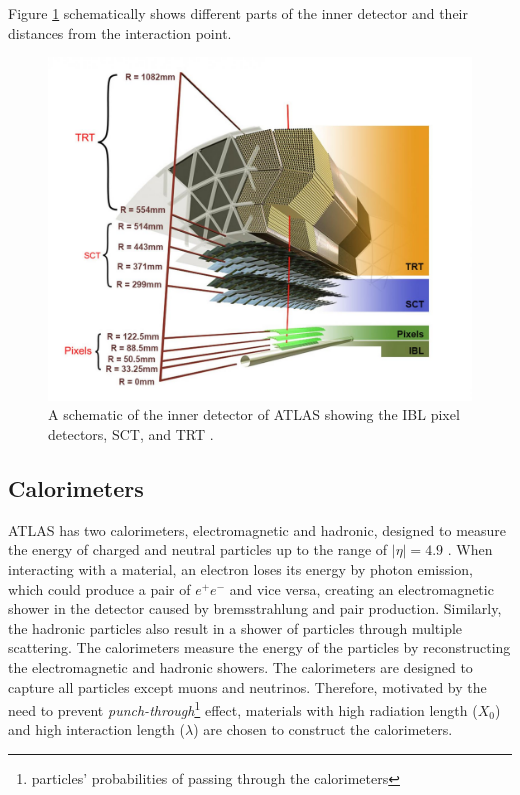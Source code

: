 Figure \ref{fig:ATLAS_ID} schematically shows different parts of the inner detector and their distances from the interaction point.

\begin{figure}
    \centering
    \includegraphics[width=.98\linewidth]{figures/LHC/ATLAS_InnerDetector.jpg}
    \caption{ A schematic of the inner detector of ATLAS showing the IBL pixel detectors, SCT, and TRT \cite{ID_Align_Run2}.\label{fig:ATLAS_ID}}
\end{figure}

\subsection{Calorimeters}
\label{subsec:Cal}

ATLAS has two calorimeters, electromagnetic and hadronic, designed to measure the energy of charged and neutral particles up to the range of $|\eta|=4.9$ \cite{ATLAS}. When interacting with a material, an electron loses its energy by photon emission, which could produce a pair of $e^{+}e^{-}$ and vice versa, creating an electromagnetic shower in the detector caused by bremsstrahlung and pair production. Similarly, the hadronic particles also result in a shower of particles through multiple scattering. The calorimeters measure the energy of the particles by reconstructing the electromagnetic and hadronic showers. The calorimeters are designed to capture all particles except muons and neutrinos. Therefore, motivated by the need to prevent \textit{punch-through}\footnote{particles' probabilities of passing through the calorimeters} effect, materials with high radiation length ($X_{0}$) and high interaction length ($\lambda$) are chosen to construct the calorimeters.

